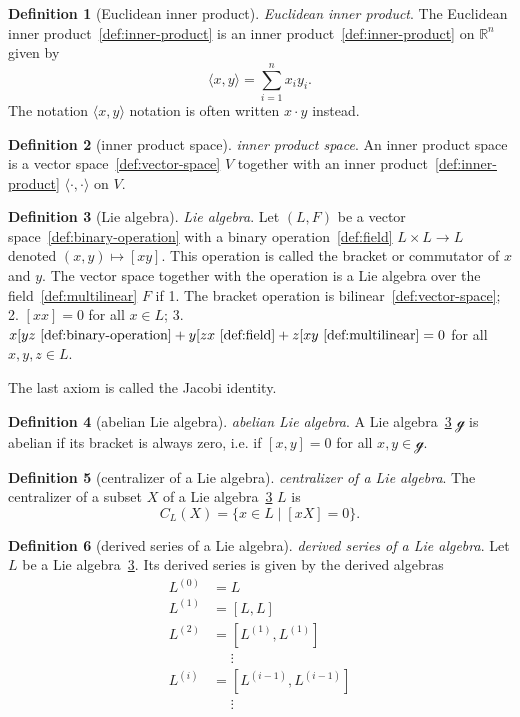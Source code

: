 \documentclass[12pt,a4paper]{article}
\theoremstyle{definition}
\newtheorem{definition}{Definition}
\begin{document}
\begin{definition}[Euclidean inner product]\label{def:euclidean-inner-product}
\emph{Euclidean inner product}. The Euclidean inner product~\ref{def:inner-product} is an inner product~\ref{def:inner-product} on $\mathbb R^n$ given by $$\langle x,y\rangle = \sum_{i=1}^n x_iy_i.$$ The notation $\langle x,y\rangle$ notation is often written $x\cdot y$ instead.
\end{definition}

\begin{definition}[inner product space]\label{def:inner-product-space}
\emph{inner product space}. An inner product space is a vector space~\ref{def:vector-space} $V$ together with an inner product~\ref{def:inner-product} $\langle\cdot,\cdot\rangle$ on $V$.
\end{definition}

\begin{definition}[Lie algebra]\label{def:lie-algebra}
\emph{Lie algebra}. Let $(L,F)$ be a vector space~\ref{def:binary-operation} with a binary operation~\ref{def:field} $L\times L \to L$ denoted $(x,y) \mapsto [xy]$. This operation is called the bracket or commutator of $x$ and $y$. The vector space together with the operation is a Lie algebra over the field~\ref{def:multilinear} $F$ if 
1. The bracket operation is bilinear~\ref{def:vector-space};
2. $[xx] = 0$ for all $x \in L$;
3. $x[yz~\ref{def:binary-operation} + y[zx~\ref{def:field}+z[xy~\ref{def:multilinear} =0$ for all $x,y,z\in L$.

The last axiom is called the Jacobi identity.
\end{definition}

\begin{definition}[abelian Lie algebra]\label{def:abelian-lie-algebra}
\emph{abelian Lie algebra}. A Lie algebra~\ref{def:lie-algebra} $\mathcal g$ is abelian if its bracket is always zero, i.e. if $[x,y] = 0$ for all $x,y\in \mathcal g$.
\end{definition}

\begin{definition}[centralizer of a Lie algebra]\label{def:centralizer-of-a-lie-algebra}
\emph{centralizer of a Lie algebra}. The centralizer of a subset $X$ of a Lie algebra~\ref{def:lie-algebra} $L$ is $$C_L(X) = \{x\in L \mid [xX]=0\}.$$
\end{definition}

\begin{definition}[derived series of a Lie algebra]\label{def:derived-series-of-a-lie-algebra}
\emph{derived series of a Lie algebra}. Let $L$ be a Lie algebra~\ref{def:lie-algebra}. Its derived series is given by the derived algebras $$\begin{align*}L^{(0)} &= L\\ L^{(1)}&= [L,L] \\ L^{(2)} &= [L^{(1)},L^{(1)}]\\ &\text{ }\text{ }\vdots \\ L^{(i)}&=[L^{(i-1)},L^{(i-1)}] \\ &\text{ }\text{ }\vdots  \end{align*}$$
\end{definition}
\end{document}
